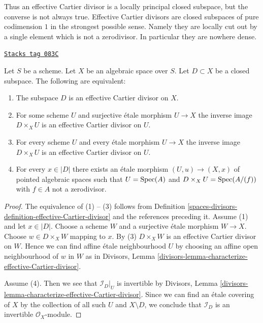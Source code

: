 Thus an effective Cartier divisor is a locally principal closed subspace,
but the converse is not always true. Effective Cartier divisors are closed
subspaces of pure codimension $1$ in the strongest possible sense. Namely
they are locally cut out by a single element which is not a zerodivisor.
In particular they are nowhere dense.

\begin{lemma}
\label{spaces-divisors-lemma-characterize-effective-Cartier-divisor}
\href{https://stacks.math.columbia.edu/tag/083C}{\texttt{Stacks tag 083C}}

Let $S$ be a scheme. Let $X$ be an algebraic space over $S$.
Let $D \subset X$ be a closed subspace.
The following are equivalent:
\begin{enumerate}
\item The subspace $D$ is an effective Cartier divisor on $X$.
\item For some scheme $U$ and surjective \'etale morphism $U \to X$
the inverse image $D \times_X U$ is an effective Cartier divisor on $U$.
\item For every scheme $U$ and every \'etale morphism $U \to X$
the inverse image $D \times_X U$ is an effective Cartier divisor on $U$.
\item For every $x \in |D|$ there exists an \'etale morphism
$(U, u) \to (X, x)$ of pointed algebraic spaces such that $U = \operatorname{Spec}(A)$
and $D \times_X U = \operatorname{Spec}(A/(f))$ with $f \in A$ not a zerodivisor.
\end{enumerate}
\end{lemma}

\begin{proof}
The equivalence of (1) -- (3) follows from
Definition \ref{spaces-divisors-definition-effective-Cartier-divisor}
and the references preceding it.
Assume (1) and let $x \in |D|$. Choose a scheme $W$ and a
surjective \'etale morphism
$W \to X$. Choose $w \in D \times_X W$ mapping to $x$.
By (3) $D \times_X W$ is an effective Cartier
divisor on $W$. Hence we can find affine \'etale neighbourhood $U$
by choosing an affine open neighbourhood of $w$ in $W$ as in
Divisors, Lemma \ref{divisors-lemma-characterize-effective-Cartier-divisor}.

\medskip\noindent
Assume (4). Then we see that $\mathcal{I}_D|_U$ is invertible by
Divisors, Lemma \ref{divisors-lemma-characterize-effective-Cartier-divisor}.
Since we can find an \'etale covering of $X$ by the collection of
all such $U$ and $X \setminus D$, we conclude that
$\mathcal{I}_D$ is an invertible $\mathcal{O}_X$-module.
\end{proof}

